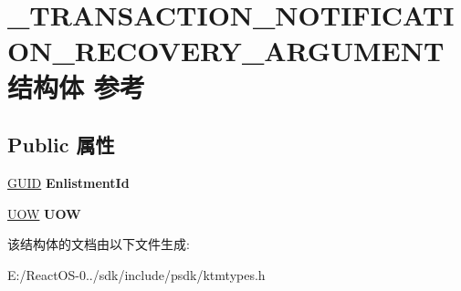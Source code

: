 \hypertarget{struct___t_r_a_n_s_a_c_t_i_o_n___n_o_t_i_f_i_c_a_t_i_o_n___r_e_c_o_v_e_r_y___a_r_g_u_m_e_n_t}{}\section{\+\_\+\+T\+R\+A\+N\+S\+A\+C\+T\+I\+O\+N\+\_\+\+N\+O\+T\+I\+F\+I\+C\+A\+T\+I\+O\+N\+\_\+\+R\+E\+C\+O\+V\+E\+R\+Y\+\_\+\+A\+R\+G\+U\+M\+E\+N\+T结构体 参考}
\label{struct___t_r_a_n_s_a_c_t_i_o_n___n_o_t_i_f_i_c_a_t_i_o_n___r_e_c_o_v_e_r_y___a_r_g_u_m_e_n_t}
\subsection*{Public 属性}
\begin{DoxyCompactItemize}
\item 
\mbox{\label{struct___t_r_a_n_s_a_c_t_i_o_n___n_o_t_i_f_i_c_a_t_i_o_n___r_e_c_o_v_e_r_y___a_r_g_u_m_e_n_t_a9c885cc29ac4edea72b3e734969fa143}} 
\hyperlink{interface_g_u_i_d}{G\+U\+ID} {\bfseries Enlistment\+Id}
\item 
\mbox{\label{struct___t_r_a_n_s_a_c_t_i_o_n___n_o_t_i_f_i_c_a_t_i_o_n___r_e_c_o_v_e_r_y___a_r_g_u_m_e_n_t_acf55d3b2acbd5335c734e55f20d26f80}} 
\hyperlink{interface_g_u_i_d}{U\+OW} {\bfseries U\+OW}
\end{DoxyCompactItemize}


该结构体的文档由以下文件生成\+:\begin{DoxyCompactItemize}
\item 
E\+:/\+React\+O\+S-\/0../sdk/include/psdk/ktmtypes.\+h\end{DoxyCompactItemize}
